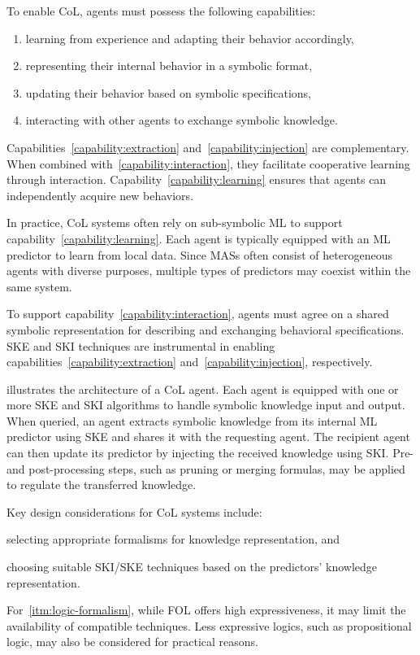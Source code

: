 To enable \gls{CoL}, agents must possess the following capabilities:
%
\begin{enumerate}
    \item\label{capability:learning} learning from experience and adapting their behavior accordingly,
    \item\label{capability:extraction} representing their internal behavior in a symbolic format,
    \item\label{capability:injection} updating their behavior based on symbolic specifications,
    \item\label{capability:interaction} interacting with other agents to exchange symbolic knowledge.
\end{enumerate}
%
Capabilities~\ref{capability:extraction} and~\ref{capability:injection} are complementary.
%
When combined with~\ref{capability:interaction}, they facilitate cooperative learning through interaction.
%
Capability~\ref{capability:learning} ensures that agents can independently acquire new behaviors.

In practice, \gls{CoL} systems often rely on sub-symbolic \gls{ML} to support capability~\ref{capability:learning}.
%
Each agent is typically equipped with an \gls{ML} predictor to learn from local data.
%
Since \glspl{MAS} often consist of heterogeneous agents with diverse purposes, multiple types of predictors may coexist within the same system.

To support capability~\ref{capability:interaction}, agents must agree on a shared symbolic representation for describing and exchanging behavioral specifications.
%
\gls{SKE} and \gls{SKI} techniques are instrumental in enabling capabilities~\ref{capability:extraction} and~\ref{capability:injection}, respectively.

%
 illustrates the architecture of a \gls{CoL} agent.
%
Each agent is equipped with one or more \gls{SKE} and \gls{SKI} algorithms to handle symbolic knowledge input and output.
%
When queried, an agent extracts symbolic knowledge from its internal \gls{ML} predictor using \gls{SKE} and shares it with the requesting agent.
%
The recipient agent can then update its predictor by injecting the received knowledge using \gls{SKI}.
%
Pre- and post-processing steps, such as pruning or merging formulas, may be applied to regulate the transferred knowledge.

Key design considerations for \gls{CoL} systems include:
%
\begin{inlinelist}
    \item\label{itm:logic-formalism} selecting appropriate formalisms for knowledge representation, and
    \item\label{itm:arsenal} choosing suitable \gls{SKI}/\gls{SKE} techniques based on the predictors' knowledge representation.
\end{inlinelist}
%
For~\ref{itm:logic-formalism}, while \gls{FOL} offers high expressiveness, it may limit the availability of compatible techniques.
%
Less expressive logics, such as propositional logic, may also be considered for practical reasons.

